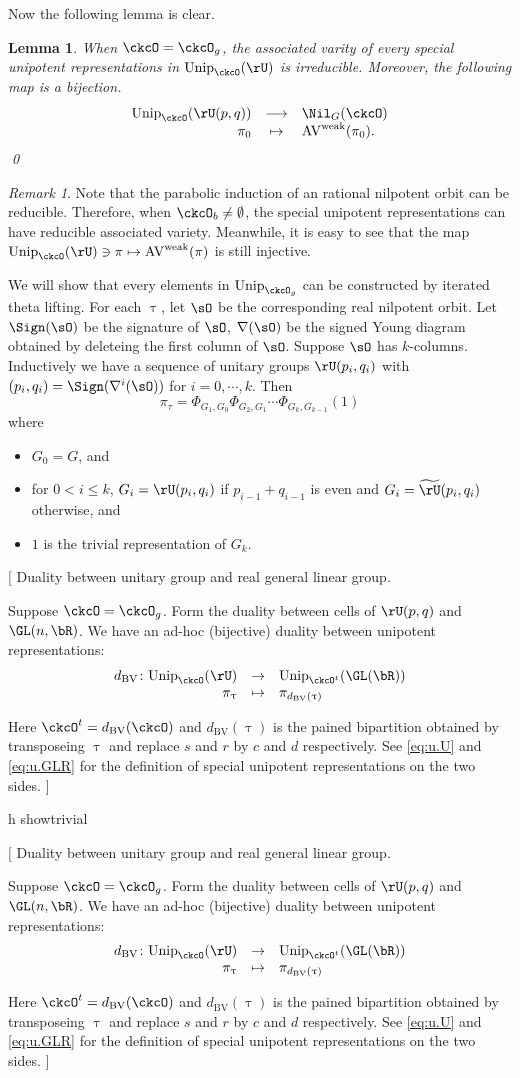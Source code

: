\documentclass[12pt,a4paper]{amsart}
\newcommand{\trivial}[2][]{\if\relax\detokenize{#1}\relax
  {%
      \color{orange} \vspace{0em} $[$  #2 $]$
      \color{black}
  }
  \else
\ifx#1h
\ifcsname showtrivial\endcsname
{%
    \color{orange} \vspace{0em}  $[$ #2 $]$
    \color{black}
}
\fi
\else {\red Wrong argument!} \fi
\fi
}
\newcommand{\AV}{\mathrm{AV}}
\def\DD{\nabla}
\numberwithin{equation}{section}
\newtheorem{lem}[thm]{Lemma}
\theoremstyle{remark}
\newtheorem{remark}[thm]{Remark}
\def\Unip{\mathrm{Unip}}
\def\wAV{\AV^{\mathrm{weak}}}
\def\dBV{d_{\mathrm{BV}}}
\def\DD{\nabla}
\def\tU{\widetilde{\rU}}
\begin{document}
Now the following lemma is clear.
\begin{lem}
When $\ckcO=\ckcO_g$, the associated varity of every special unipotent representations in $\Unip_\ckcO(\rU)$
is irreducible. Moreover, the following map  is a bijection.
\[
  \begin{array}{rcl}
  \Unip_{\ckcO}(\rU(p,q)) &\longrightarrow& \Nil_{G}(\ckcO)\\
  \pi_0 & \mapsto & \wAV(\pi_0).
  \end{array}
\]
\qed
\end{lem}
\begin{remark}
  Note that the parabolic induction of an rational nilpotent orbit can be reducible.
  Therefore, when $\ckcO_b\neq \emptyset$, the special unipotent representations can have
  reducible associated variety. Meanwhile, it is easy to see that the map
  $\Unip_{\ckcO}(\rU) \ni \pi \mapsto\wAV(\pi)$ is still injective.
\end{remark}

We will show that every elements in $\Unip_{\ckcO_g}$ can be constructed by iterated theta lifting.
For each $\uptau$, let $\sO$ be the corresponding real nilpotent orbit. Let
$\Sign(\sO)$ be the signature of $\sO$, $\DD(\sO)$ be the signed Young diagram
obtained by deleteing the first column of $\sO$.
Suppose $\sO$ has $k$-columns. Inductively we have a sequence of unitary groups
$\rU(p_i,q_i)$ with $(p_i,q_i) = \Sign(\DD^i(\sO))$ for $i=0, \cdots, k$. Then
\begin{equation}\label{eq:u.U}
  \pi_\tau = \Phi_{G_{1},G_{0}} \Phi_{G_{2},G_{1}}\cdots \Phi_{G_{k},G_{k-1}} (1)
\end{equation}
where
\begin{itemize}
  \item
  $G_{0}=G$, and
  \item for $0<i\leq k$, $G_{i} = \rU(p_{i},q_{i})$ if $p_{i-1}+q_{i-1}$ is even and
 $G_{i} = \tU(p_{i},q_{i})$ otherwise, and
  \item
$1$ is the trivial representation of $G_{k}$.
\end{itemize}


\trivial{
  Duality between unitary group and real general linear group.

Suppose $\ckcO = \ckcO_g$. Form the duality between cells of $\rU(p,q)$ and
$\GL(n,\bR)$. We have an ad-hoc (bijective) duality between unipotent
representations:
\[
  \begin{array}{rcl}
 \dBV\colon \Unip_{\ckcO}(\rU)& \rightarrow &\Unip_{\ckcO^t}(\GL(\bR)) \\
 \pi_\uptau &\mapsto& \pi_{\dBV(\uptau)} \\
  \end{array}
\]

Here $\ckcO^t = \dBV(\ckcO)$ and $\dBV(\uptau)$ is the pained bipartition
obtained by transposeing $\uptau$ and replace $s$ and $r$ by $c$ and $d$
respectively. See \eqref{eq:u.U} and \eqref{eq:u.GLR} for the definition of
special unipotent representations on the two sides.
}
\end{document}
